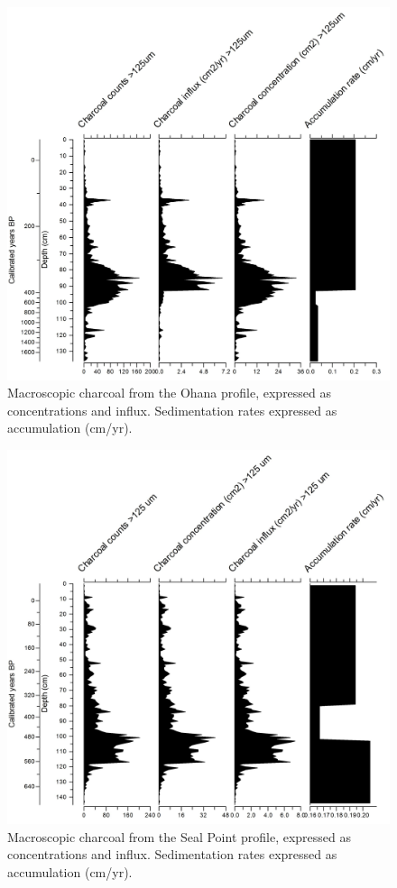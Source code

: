 \begin{figure}
\centering
\includegraphics{ohana.jpg}
\caption{Macroscopic charcoal from the Ohana profile, expressed as
concentrations and influx. Sedimentation rates expressed as accumulation
(cm/yr).{}}
\end{figure}

\begin{figure}
\centering
\includegraphics{seal.jpg}
\caption{Macroscopic charcoal from the Seal Point profile, expressed as
concentrations and influx. Sedimentation rates expressed as accumulation
(cm/yr).{}}
\end{figure}

